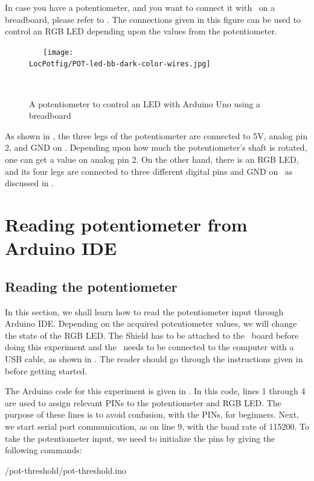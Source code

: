 In case you have a potentiometer, and you want to connect it with \arduino\ on a breadboard, 
please refer to . The connections given in this figure 
can be used to control an RGB LED depending upon the values from the potentiometer.  
\begin{figure}
  \centering
  \texttt{[image: \\LocPotfig/POT-led-bb-dark-color-wires.jpg]}
  \caption{A potentiometer to control an LED with Arduino Uno using a breadboard}
  \label{fig:pot-led}
\end{figure}
As shown in , the three legs of the potentiometer are connected to 
5V, analog pin 2, and GND on \arduino. Depending upon how much the potentiometer's shaft is rotated, one can get a value on analog pin 2. On the other hand, 
there is an RGB LED, and its four legs are connected to three different digital pins and GND on \arduino\, as discussed in 
.


\section{Reading potentiometer from Arduino IDE}
\subsection{Reading the potentiometer}
In this section, we shall learn how to read the potentiometer 
input through Arduino IDE. Depending on the acquired potentiometer 
values, we will change the state of the RGB LED. The Shield has to be attached to the \arduino\ board
before doing this experiment and the \arduino\ needs to be connected to the computer 
with a USB cable, as shown in . The reader should go through the
instructions given in  before getting started.

The Arduino code for this experiment is given in . 
In this code, lines 1 through 4 are used to assign relevant PINs to 
the potentiometer and RGB LED. The purpose of these lines is to avoid 
confusion, with the PINs, for beginners. Next, we start serial port 
communication, as on line 9, with the baud rate of 115200. 
To take the potentiometer input, we need to initialize the pins by 
giving the following commands:


{\LocPotardcode/pot-threshold/pot-threshold.ino}

